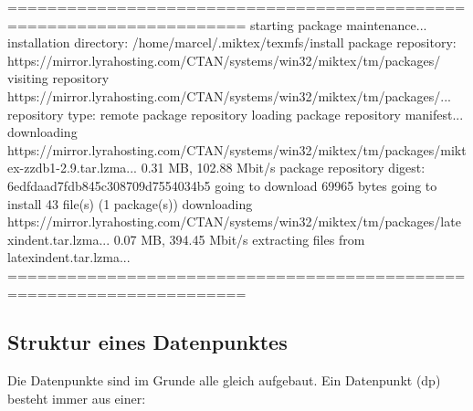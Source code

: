 
======================================================================
starting package maintenance...
installation directory: /home/marcel/.miktex/texmfs/install
package repository: https://mirror.lyrahosting.com/CTAN/systems/win32/miktex/tm/packages/
visiting repository https://mirror.lyrahosting.com/CTAN/systems/win32/miktex/tm/packages/...
repository type: remote package repository
loading package repository manifest...
downloading https://mirror.lyrahosting.com/CTAN/systems/win32/miktex/tm/packages/miktex-zzdb1-2.9.tar.lzma...
0.31 MB, 102.88 Mbit/s
package repository digest: 6edfdaad7fdb845c308709d7554034b5
going to download 69965 bytes
going to install 43 file(s) (1 package(s))
downloading https://mirror.lyrahosting.com/CTAN/systems/win32/miktex/tm/packages/latexindent.tar.lzma...
0.07 MB, 394.45 Mbit/s
extracting files from latexindent.tar.lzma...
======================================================================
\subsection{Struktur eines Datenpunktes}

Die Datenpunkte sind im Grunde alle gleich aufgebaut. Ein Datenpunkt (dp) besteht immer aus einer:

